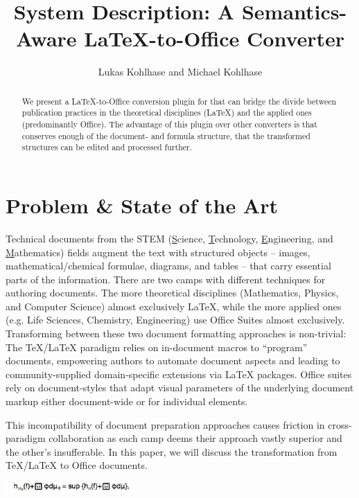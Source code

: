 \documentclass{article}
\title{System Description: A Semantics-Aware {\LaTeX}-to-Office Converter}
\author{Lukas Kohlhase and Michael Kohlhase}
\begin{document}
 
\maketitle
\begin{abstract}
  We present a {\LaTeX}-to-Office conversion plugin for  that can bridge the
  divide between publication practices in the theoretical disciplines (\LaTeX) and the
  applied ones (predominantly Office). The advantage of this plugin over other converters
  is that  conserves enough of the document- and formula structure, that the
  transformed structures can be edited and processed further.
\end{abstract}

\section{Problem \& State of the Art}\label{sec:intro}

Technical documents from the STEM (\underline{S}cience, \underline{T}echnology,
\underline{E}ngineering, and \underline{M}athematics) fields augment the text with structured
objects -- images, mathematical/chemical formulae, diagrams, and tables -- that carry
essential parts of the information. There are two camps with different techniques for
authoring documents. The more theoretical disciplines (Mathematics, Physics, and Computer
Science) almost exclusively {\LaTeX}, while the more applied ones (e.g. Life Sciences,
Chemistry, Engineering) use Office Suites almost exclusively. Transforming between these
two document formatting approaches is non-trivial: The {\TeX/\LaTeX} paradigm relies on
in-document macros to ``program'' documents, empowering authors to automate document
aspects and leading to community-supplied domain-specific extensions via {\LaTeX}
packages. Office suites rely on document-styles that adapt visual parameters of the
underlying document markup either document-wide or for individual elements.

This incompatibility of document preparation approaches causes friction in cross-paradigm
collaboration as each camp deems their approach vastly superior and the other's
insufferable. In this paper, we will discuss the transformation from {\TeX/\LaTeX} to
Office documents.


    \includegraphics[width=5cm]{mathsnippet-libreoffice}\\\hline
\end{document}
